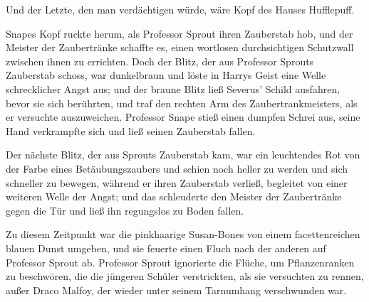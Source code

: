 Und der Letzte, den man verdächtigen würde, wäre Kopf des Hauses Hufflepuff.

Snapes Kopf ruckte herum, als Professor Sprout ihren Zauberstab hob, und der Meister der Zaubertränke schaffte es, einen wortlosen durchsichtigen Schutzwall zwischen ihnen zu errichten. Doch der Blitz, der aus Professor Sprouts Zauberstab schoss, war dunkelbraun und löste in Harrys Geist eine Welle schrecklicher Angst aus; und der braune Blitz ließ Severus’ Schild ausfahren, bevor sie sich berührten, und traf den rechten Arm des Zaubertrankmeisters, als er versuchte auszuweichen. Professor Snape stieß einen dumpfen Schrei aus, seine Hand verkrampfte sich und ließ seinen Zauberstab fallen.

Der nächste Blitz, der aus Sprouts Zauberstab kam, war ein leuchtendes Rot von der Farbe eines Betäubungszaubers und schien noch heller zu werden und sich schneller zu bewegen, während er ihren Zauberstab verließ, begleitet von einer weiteren Welle der Angst; und das schleuderte den Meister der Zaubertränke gegen die Tür und ließ ihn regungslos zu Boden fallen.

Zu diesem Zeitpunkt war die pinkhaarige Susan-Bones von einem facettenreichen blauen Dunst umgeben, und sie feuerte einen Fluch nach der anderen auf Professor Sprout ab. Professor Sprout ignorierte die Flüche, um Pflanzenranken zu beschwören, die die jüngeren Schüler verstrickten, als sie versuchten zu rennen, außer Draco Malfoy, der wieder unter seinem Tarnumhang verschwunden war.

